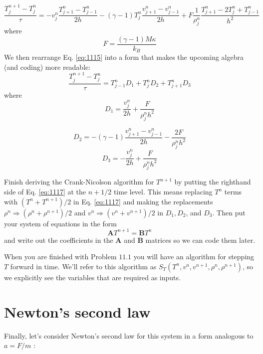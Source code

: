 \begin{equation}\label{eq:1115}
\frac{T_{j}^{n+1}-T_{j}^{n}}{\tau}=-v_{j}^{n} \frac{T_{j+1}^{n}-T_{j-1}^{n}}{2 h}-(\gamma-1) T_{j}^{n} \frac{v_{j+1}^{n}-v_{j-1}^{n}}{2 h}+F \frac{1}{\rho_{j}^{n}} \frac{T_{j+1}^{n}-2 T_{j}^{n}+T_{j-1}^{n}}{h^{2}}
\end{equation}
where
\begin{equation}\label{eq:1116}
F=\frac{(\gamma-1) M \kappa}{k_{B}}
\end{equation}
We then rearrange Eq. \eqref{eq:1115} into a form that makes the upcoming algebra (and
coding) more readable:
\begin{equation}\label{eq:1117}
\frac{T_{j}^{n+1}-T_{j}^{n}}{\tau}=T_{j-1}^{n} D_{1}+T_{j}^{n} D_{2}+T_{j+1}^{n} D_{3}
\end{equation}
where
\begin{equation}\label{eq:1118}
D_{1}=\frac{v_{j}^{n}}{2 h}+\frac{F}{\rho_{j}^{n} h^{2}}
\end{equation}

\begin{equation}\label{eq:1119}
D_{2}=-(\gamma-1) \frac{v_{j+1}^{n}-v_{j-1}^{n}}{2 h}-\frac{2 F}{\rho_{j}^{n} h^{2}}
\end{equation}
\begin{equation}\label{eq:1120}
D_{3}=-\frac{v_{j}^{n}}{2 h}+\frac{F}{\rho_{j}^{n} h^{2}}
\end{equation}
\begin{problem}\label{P11.1}
Finish deriving the Crank-Nicolson algorithm for $T^{n+1}$ by putting the righthand side of Eq. \eqref{eq:1117} at the $n+1 / 2$ time level. This means replacing $T^{n}$ terms with $\left(T^{n}+T^{n+1}\right) / 2$ in Eq. \eqref{eq:1117} and making the replacements $\rho^{n} \Rightarrow\left(\rho^{n}+\rho^{n+1}\right) / 2$ and $v^{n} \Rightarrow\left(v^{n}+v^{n+1}\right) / 2$ in $D_{1}, D_{2}$, and $D_{3}$. Then put your system of equations in the form
\begin{equation*}
\mathbf{A} T^{n+1}=\mathbf{B} T^{n}
\end{equation*}
and write out the coefficients in the $\mathbf{A}$ and $\mathbf{B}$ matrices so we can code them later.\end{problem}
When you are finished with Problem $11.1$ you will have an algorithm for stepping $T$ forward in time. We'll refer to this algorithm as $S_{T}\left(T^{n}, v^{n}, v^{n+1}, \rho^{n}, \rho^{n+1}\right)$, so we explicitly see the variables that are required as inputs.
\section*{Newton\rq s second law}
Finally, let\rq s consider Newton\rq s second law for this system in a form analogous to $a=F / m$ :

